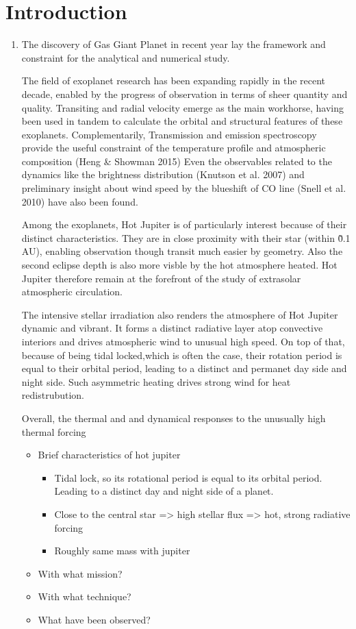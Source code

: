 \documentclass[11pt]{article}
\begin{document}
\section{Introduction}

\begin{enumerate}

\item The discovery of Gas Giant Planet in recent year lay the framework and constraint for the analytical and numerical study. 

The field of exoplanet research has been expanding rapidly in the recent decade, enabled by the progress of observation in terms of sheer quantity and quality. Transiting and radial velocity emerge as the main workhorse, having been used in tandem to calculate the orbital and structural features of these exoplanets.  Complementarily, Transmission and emission spectroscopy provide the useful constraint of the temperature profile and atmospheric composition (Heng \& Showman 2015)  Even the observables related to the dynamics like the brightness distribution (Knutson et al. 2007) and preliminary insight about wind speed by the blueshift of CO line (Snell et al. 2010) have also been found.

Among the exoplanets, Hot Jupiter is of particularly interest because of their distinct characteristics. They are in close proximity with their star (within \~ 0.1 AU), enabling observation though transit much easier by geometry. Also the second eclipse depth is also more visble by the hot atmosphere heated. Hot Jupiter therefore remain at the forefront of the study of extrasolar atmospheric circulation.

The intensive stellar irradiation also renders the atmosphere of Hot Jupiter dynamic and vibrant.  It forms a distinct radiative layer atop convective interiors and drives atmospheric wind to unusual high speed. On top of that, because of being tidal locked,which is often the case, their rotation period is equal to their orbital period, leading to a distinct and permanet day side and night side. Such asymmetric heating drives strong wind for heat redistrubution. 

Overall, the thermal and and dynamical responses to the unusually high thermal forcing 

\begin{itemize}
\item Brief characteristics of hot jupiter
\begin{itemize}
\item Tidal lock, so its rotational period is equal to its orbital period. Leading to a distinct day and night side of a planet.
\item Close to the central star => high stellar flux => hot, strong radiative forcing 
\item Roughly same mass with jupiter
\end{itemize}
\item With what mission?
\item With what technique?
\item What have been observed?
\end{itemize}


\end{enumerate}
\end{document}
